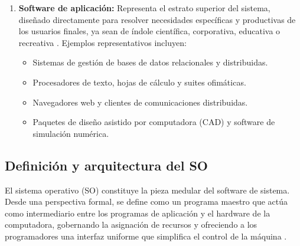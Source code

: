 \documentclass[12pt]{article}
\begin{document}
\begin{enumerate}[leftmargin=*]
    \item \textbf{Software de aplicación:} Representa el estrato superior del sistema, diseñado directamente para resolver necesidades específicas y productivas de los usuarios finales, ya sean de índole científica, corporativa, educativa o recreativa \parencite[\S 1.1, p.\ 4]{silberschatz2006fundamentos}. Ejemplos representativos incluyen:
    \begin{itemize}[noitemsep, topsep=2pt]
        \item Sistemas de gestión de bases de datos relacionales y distribuidas.
        \item Procesadores de texto, hojas de cálculo y suites ofimáticas.
        \item Navegadores web y clientes de comunicaciones distribuidas.
        \item Paquetes de diseño asistido por computadora (CAD) y software de simulación numérica.
    \end{itemize}
\end{enumerate}

\subsection{Definición y arquitectura del SO}\label{sec:definicionArquitecturaSo}

El sistema operativo (SO) constituye la pieza medular del software de sistema. Desde una perspectiva formal, se define como un programa maestro que actúa como intermediario entre los programas de aplicación y el hardware de la computadora, gobernando la asignación de recursos y ofreciendo a los programadores una interfaz uniforme que simplifica el control de la máquina \parencite[\S 2.1, p.\ 69]{stallings2018operating}.
\end{document}
